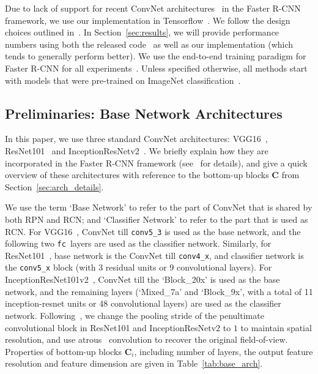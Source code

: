 \documentclass[10pt,twocolumn,letterpaper]{article}
\newcommand{\vv}[1]{{\texttt{#1}}}
\newcommand{\conv}{\vv{conv}}
\newcommand{\fc}{\vv{fc}}
\begin{document}
Due to lack of support for recent ConvNet architectures~\cite{resnet,szegedy2016inception} in the Faster R-CNN framework, we use our implementation in Tensorflow~\cite{abadi2016tensorflow}. We follow the design choices outlined in~\cite{huang2016speed}.
In Section~\ref{sec:results}, we will provide performance numbers using both the released code~\cite{ren2015faster} as well as our implementation (which tends to generally perform better). We use the end-to-end training paradigm for Faster R-CNN for all experiments~\cite{ren2015faster}. Unless specified otherwise, all methods start with models that were pre-trained on ImageNet classification~\cite{imagenet,rcnn}. 

\vspace{-0.01in}
\subsection{Preliminaries: Base Network Architectures}
\vspace{-0.01in}
In this paper, we use three standard ConvNet architectures: VGG16~\cite{VGG}, ResNet101~\cite{resnet} and InceptionResNetv2~\cite{szegedy2016inception}. We briefly explain how they are incorporated in the Faster R-CNN framework (see~\cite{ren2015faster,resnet,huang2016speed} for details), and give a quick overview of these architectures with reference to the bottom-up blocks $\mathbf{C}$ from Section~\ref{sec:arch_details}.

We use the term `Base Network' to refer to the part of ConvNet that is shared by both RPN and RCN; and `Classifier Network' to refer to the part that is used as RCN. For VGG16~\cite{VGG,ren2015faster}, ConvNet till \conv\verb|5_3| is used as the base network, and the following two \fc\ layers are used as the classifier network. Similarly, for ResNet101~\cite{resnet,ren2015faster}, base network is the ConvNet till \conv\verb|4_x|, and classifier network is the \conv\verb|5_x| block (with $3$ residual units or $9$ convolutional layers). For InceptionResNet101v2~\cite{szegedy2016inception,huang2016speed}, ConvNet till the `Block\_20x' is used as the base network, and the remaining layers (`Mixed\_7a' and `Block\_9x', with a total of 11 inception-resnet units or 48 convolutional layers) are used as the classifier network. Following~\cite{huang2016speed}, we change the pooling stride of the penultimate convolutional block in ResNet101 and InceptionResNetv2 to $1$ to maintain spatial resolution, and use atrous~\cite{deeplab,liu2015parsenet} convolution to recover the original field-of-view. Properties of bottom-up blocks $\mathbf{C}_i$, including number of layers, the output feature resolution and feature dimension \etc are given in Table~\ref{tab:base_arch}.
\end{document}
